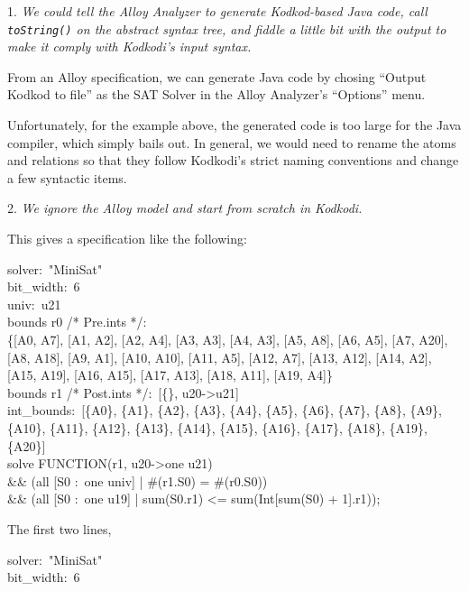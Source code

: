 \documentclass[a4paper,12pt]{article}
\begin{document}
    \begin{enum}
        \item[1.] \textsl{We could tell the Alloy Analyzer to generate Kodkod-based Java
        code, call \texttt{\textsl{toString()}} on the abstract syntax tree, and fiddle
        a little bit with the output to make it comply with Kodkodi's input syntax.}

        From an Alloy specification, we can generate Java code by chosing ``Output
        Kodkod to file'' as the SAT Solver in the Alloy Analyzer's ``Options'' menu.

        Unfortunately, for the example above, the generated code is too large for the
        Java compiler, which simply bails out. In general, we would need to rename the
        atoms and relations so that they follow Kodkodi's strict naming conventions and
        change a few syntactic items.

        \item[2.]
        \textsl{We ignore the Alloy model and start from scratch in Kodkodi.}

        This gives a specification like the following:

        \pre
        \ttfamily\small
        solver:~"MiniSat" \\
        bit\_width:~6 \\
        univ:~u21 \\
        bounds r0 /* Pre.ints */: \\
        \{[A0, A7], [A1, A2], [A2, A4], [A3, A3], [A4, A3], [A5, A8], [A6, A5],
        [A7, A20], [A8, A18], [A9, A1], [A10, A10], [A11, A5], [A12, A7], [A13, A12],
        [A14, A2], [A15, A19], [A16, A15], [A17, A13], [A18, A11], [A19, A4]\} \\
        bounds r1 /* Post.ints */:~[\{\}, u20->u21] \\
        int\_bounds:~[\{A0\}, \{A1\}, \{A2\}, \{A3\}, \{A4\}, \{A5\}, \{A6\}, \{A7\},
        \{A8\}, \{A9\}, \{A10\}, \{A11\}, \{A12\}, \{A13\}, \{A14\}, \{A15\}, \{A16\},
        \{A17\}, \{A18\}, \{A19\}, \{A20\}] \\
        solve FUNCTION(r1, u20->one u21) \\
        \&\& (all [S0 :~one univ] | \#(r1.S0) = \#(r0.S0)) \\
        \&\& (all [S0 :~one u19] | sum(S0.r1) <= sum(Int[sum(S0) + 1].r1));
        \post

        The first two lines,

        \pre
        \ttfamily\small
        solver:~"MiniSat" \\
        bit\_width:~6
        \post


\end{enum}
\end{document}
